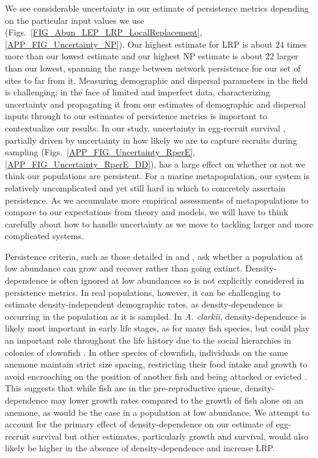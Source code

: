 \documentclass[12pt, oneside]{article}   	%
\begin{document}
We see considerable uncertainty in our estimate of persistence metrics depending on the particular input values we use (Figs.\ \ref{FIG_Abun_LEP_LRP_LocalReplacement}, \ref{APP_FIG_Uncertainty_NP}). Our highest estimate for LRP is about 24 times more than our lowest estimate and our highest NP estimate is about 22 larger than our lowest, spanning the range between network persistence for our set of sites to far from it. Measuring demographic and dispersal parameters in the field is challenging; in the face of limited and imperfect data, characterizing uncertainty and propagating it from our estimates of demographic and dispersal inputs through to our estimates of persistence metrics is important to contextualize our results. In our study, uncertainty in egg-recruit survival \citep[a commonly challenging parameter to estimate, e.g.][]{johnson2018integrating,hameed2016inverse}, partially driven by uncertainty in how likely we are to capture recruits during sampling (Figs.\ \ref{APP_FIG_Uncertainty_RperE}, \ref{APP_FIG_Uncertainty_RperE_DD}), has a large effect on whether or not we think our populations are persistent. For a marine metapopulation, our system is relatively uncomplicated and yet still hard in which to concretely assertain persistence. As we accumulate more empirical assessments of metapopulations to compare to our expectations from theory and models, we will have to think carefully about how to handle uncertainty as we move to tackling larger and more complicated systems. %

Persistence criteria, such as those detailed in \cite{hastings_persistence_2006} and \cite{burgess2014beyond}, ask whether a population at low abundance can grow and recover rather than going extinct. Density-dependence is often ignored at low abundances \citep[e.g.][]{caswell_matrix_2001, hastings_simple_2006} so is not explicitly considered in persistence metrics. In real populations, however, it can be challenging to estimate density-independent demographic rates, as density-dependence is occurring in the population as it is sampled. In \textit{A. clarkii}, density-dependence is likely most important in early life stages, as for many fish species, but could play an important role throughout the life history due to the social hierarchies in colonies of clownfish \citep[e.g.][]{buston2011determinants}. In other species of clownfish, individuals on the same anemone maintain strict size spacing, restricting their food intake and growth to avoid encroaching on the position of another fish and being attacked or evicted \citep[seen in \textit{A. percula},][]{buston2003forcible, buston2003social}. This suggests that while fish are in the pre-reproductive queue, density-dependence may lower growth rates compared to the growth of fish alone on an anemone, as would be the case in a population at low abundance. We attempt to account for the primary effect of density-dependence on our estimate of egg-recruit survival but other estimates, particularly growth and survival, would also likely be higher in the absence of density-dependence and increase LRP.
\end{document}

